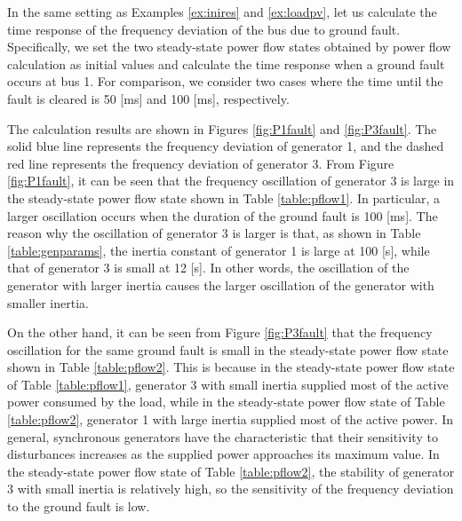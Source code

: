\documentclass[graybox, envcountchap]{svmult}
\begin{document}
\begin{example}\label{ex:busflt}

In the same setting as Examples \ref{ex:inires} and \ref{ex:loadpv}, let us
calculate the time response of the frequency deviation of the bus due to ground
fault. Specifically, we set the two steady-state power flow states obtained by
power flow calculation as initial values and calculate the time response when a
ground fault occurs at bus 1. For comparison, we consider two cases where the
time until the fault is cleared is 50 [ms] and 100 [ms], respectively.

The calculation results are shown in Figures \ref{fig:P1fault} and
\ref{fig:P3fault}.  The solid blue line represents the frequency deviation of
generator 1, and the dashed red line represents the frequency deviation of
generator 3.  From Figure \ref{fig:P1fault}, it can be seen that the frequency
oscillation of generator 3 is large in the steady-state power flow state shown
in Table \ref{table:pflow1}.  In particular, a larger oscillation occurs when
the duration of the ground fault is 100 [ms].  The reason why the oscillation of
generator 3 is larger is that, as shown in Table \ref{table:genparams}, the
inertia constant of generator 1 is large at 100 [s], while that of generator 3
is small at 12 [s].  In other words, the oscillation of the generator with
larger inertia causes the larger oscillation of the generator with smaller
inertia.

On the other hand, it can be seen from Figure \ref{fig:P3fault} that the frequency
oscillation for the same ground fault is small in the steady-state power flow
state shown in Table \ref{table:pflow2}. This is because in the steady-state
power flow state of Table \ref{table:pflow1}, generator 3 with small inertia
supplied most of the active power consumed by the load, while in the
steady-state power flow state of Table \ref{table:pflow2}, generator 1 with
large inertia supplied most of the active power. In general, synchronous
generators have the characteristic that their sensitivity to disturbances
increases as the supplied power approaches its maximum value. In the
steady-state power flow state of Table \ref{table:pflow2}, the stability of
generator 3 with small inertia is relatively high, so the sensitivity of the
frequency deviation to the ground fault is low.
\end{example}
\end{document}
